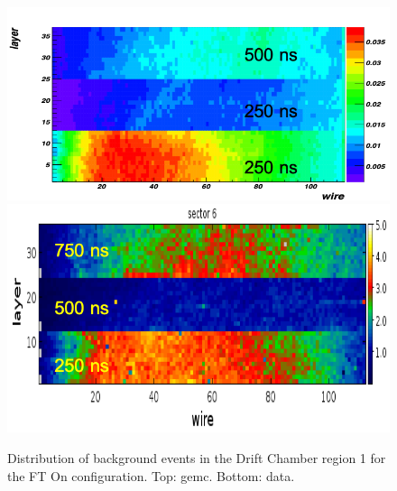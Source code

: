 \begin{figure}
	\centering
	\includegraphics[width=0.95\columnwidth,keepaspectratio]{img/ftOnGemcDCRates.png}
	\includegraphics[width=0.95\columnwidth,keepaspectratio]{img/ftOnDataDCRates.png}
	\caption{Distribution of background events in the Drift Chamber region 1 for the FT On configuration.
             Top: gemc. Bottom: data.}
	\label{fig:ftOnComparison}
\end{figure}


